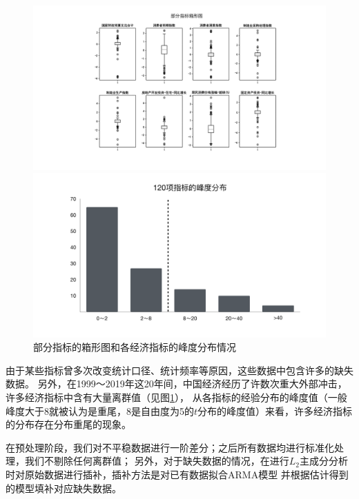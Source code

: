 \begin{figure}[H]
    \begin{minipage}[t]{1\textwidth}
    \centering
    \includegraphics[width=18cm]{pics/chapter2/box.pdf}
    \end{minipage}
    \begin{minipage}[t]{1\textwidth}
    \centering
    \includegraphics[width=12cm]{pics/chapter2/skew.pdf}
    \end{minipage}
    \caption{\small 部分指标的箱形图和各经济指标的峰度分布情况}
    \label{desc}
\end{figure}

由于某些指标曾多次改变统计口径、统计频率等原因，这些数据中包含许多的缺失数据。
另外，在1999～2019年这20年间，中国经济经历了许数次重大外部冲击，许多经济指标中含有大量离群值（见图\ref{desc}），
从各指标的经验分布的峰度值（一般峰度大于8就被认为是重尾，8是自由度为5的$t$分布的峰度值）来看，许多经济指标的分布存在分布重尾的现象。

在预处理阶段，我们对不平稳数据进行一阶差分；之后所有数据均进行标准化处理，我们不剔除任何离群值；
另外，对于缺失数据的情况，在进行$L_2$主成分分析时对原始数据进行插补，插补方法是对已有数据拟合ARMA模型
并根据估计得到的模型填补对应缺失数据。


